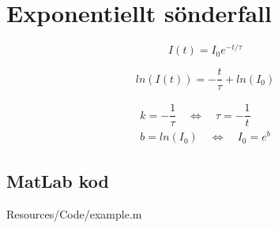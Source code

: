 \section*{Exponentiellt sönderfall}

\begin{equation} \label{eq:I_t}
	I(t) = I_0e^{-t/\tau}
\end{equation}

\begin{equation} \label{eq:log_I}
	ln(I(t)) = -\dfrac{t}{\tau} + ln(I_0)
\end{equation}



\begin{eqnarray*}
	k = -\dfrac{1}{\tau} \quad \Leftrightarrow \quad
	\tau = -\dfrac{1}{t} \\
	b = ln(I_0) \quad \Leftrightarrow \quad
	I_0 = e^{b}
\end{eqnarray*}


\subsection*{MatLab kod}

 {Resources/Code/example.m}